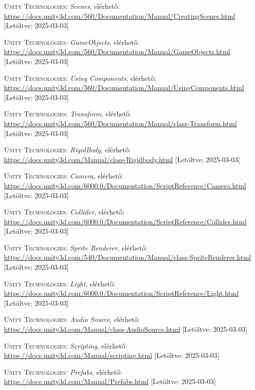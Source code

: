 \documentclass[]{thesis-ekf}
\theoremstyle{definition}
\theoremstyle{remark}
\begin{document}
\begin{thebibliography}{2}
	\textsc{Unity Technologies}: \emph{Scenes}, elérhető:
	\url{https://docs.unity3d.com/560/Documentation/Manual/CreatingScenes.html} [Letöltve: 2025-03-03]
	
	\textsc{Unity Technologies}: \emph{GameObjects}, elérhető:
	\url{https://docs.unity3d.com/560/Documentation/Manual/GameObjects.html} [Letöltve: 2025-03-03]
	
	\textsc{Unity Technologies}: \emph{Using Components}, elérhető:
	\url{https://docs.unity3d.com/560/Documentation/Manual/UsingComponents.html} [Letöltve: 2025-03-03]
	
	\textsc{Unity Technologies}: \emph{Transform}, elérhető:
	\url{https://docs.unity3d.com/560/Documentation/Manual/class-Transform.html} [Letöltve: 2025-03-03]
	
	\textsc{Unity Technologies}: \emph{RigidBody}, elérhető:
	\url{https://docs.unity3d.com/Manual/class-Rigidbody.html} [Letöltve: 2025-03-03]
	
	\textsc{Unity Technologies}: \emph{Camera}, elérhető:
	\url{https://docs.unity3d.com/6000.0/Documentation/ScriptReference/Camera.html} [Letöltve: 2025-03-03]
	
	\textsc{Unity Technologies}: \emph{Collider}, elérhető:
	\url{https://docs.unity3d.com/6000.0/Documentation/ScriptReference/Collider.html} [Letöltve: 2025-03-03]
	
	\textsc{Unity Technologies}: \emph{Sprite Renderer}, elérhető:
	\url{https://docs.unity3d.com/540/Documentation/Manual/class-SpriteRenderer.html} [Letöltve: 2025-03-03]
	
	\textsc{Unity Technologies}: \emph{Light}, elérhető:
	\url{https://docs.unity3d.com/6000.0/Documentation/ScriptReference/Light.html} [Letöltve: 2025-03-03]
	
	\textsc{Unity Technologies}: \emph{Audio Source}, elérhető:
	\url{https://docs.unity3d.com/Manual/class-AudioSource.html} [Letöltve: 2025-03-03]
	
	\textsc{Unity Technologies}: \emph{Scripting}, elérhető:
	\url{https://docs.unity3d.com/Manual/scripting.html} [Letöltve: 2025-03-03]
	
	\textsc{Unity Technologies}: \emph{Prefabs}, elérhető:
	\url{https://docs.unity3d.com/Manual/Prefabs.html} [Letöltve: 2025-03-03]
	

\end{thebibliography}
\end{document}
